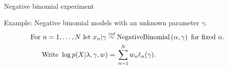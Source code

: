 





\begin{frame}{Negative binomial experiment}

Example: Negative binomial models with an unknown parameter $\gamma$.
%
\begin{align*}
\textrm{For }n={} 1,\ldots, N \textrm{ let }
    x_n |  \gamma \overset{iid}{\sim}{}& \textrm{NegativeBinomial}\left(\alpha, \gamma \right)
    \textrm{ for fixed }\alpha.\\
\textrm{Write }\log p(X \vert \lambda, \gamma, w) ={}&
       \sum_{n=1}^N w_n \ell_n(\gamma).
\end{align*}
%
\pause
%
\LowDimAccuracyGraph{}
%   
\end{frame}
    

    

